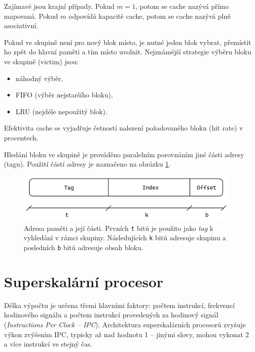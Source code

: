 Zajímavé jsou krajní případy.
Pokud $m = 1$, potom se cache nazývá přímo mapovaná.
Pokud $m$ odpovídá kapacitě cache, potom se cache nazývá plně asociativní.

Pokud ve skupině není pro nový blok místo, je nutné jeden blok vybrat, přemístit ho zpět do hlavní paměti a tím místo uvolnit.
Nejznámější strategie výběru bloku ve skupině (victim) jsou:
\begin{itemize}
    \item náhodný výběr,
    \item FIFO (výběr nejstaršího bloku),
    \item LRU (nejdéle nepoužitý blok).
\end{itemize}
Efektivita cache se vyjadřuje četností nalezení požadovaného bloku (hit rate) v procentech.

Hledání bloku ve skupině je prováděno paralelním porovnáním jiné části adresy (tagu).
Použití částí adresy je naznačeno na obrázku \ref{cachelineaddress}.

\begin{figure}[ht]\centering
  \includegraphics[width=11cm]{obrazky-figures/cacheline.png}
  \caption{Adresa paměti a její části. Prvních \texttt{t} bitů je použito jako \emph{tag} k vyhledání v rámci skupiny. Následujících \texttt{k} bitů adresuje skupinu a posledních \texttt{b} bitů adresuje obsah bloku.}
  \label{cachelineaddress}
\end{figure}


\chapter{Superskalární procesor}

Délka výpočtu je určena třemi hlavními faktory: počtem instrukcí, frekvencí hodinového signálu a počtem instrukcí provedených za hodinový signál (\emph{Instructions Per Clock -- IPC}).
Architektura superskalárních procesorů zvyšuje výkon zvýšením IPC, typicky až nad hodnotu 1 -- jinými slovy, mohou vykonat 2 a více instrukcí ve stejný čas. \cite{QuantApproach}

